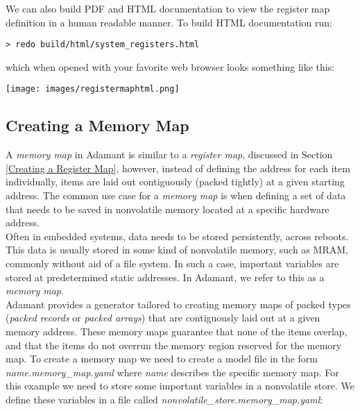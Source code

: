 We can also build PDF and HTML documentation to view the register map definition in a human readable manner. To build HTML documentation run:

\vspace{5mm} %
\begin{verbatim}
> redo build/html/system_registers.html
\end{verbatim}
\vspace{5mm} %

which when opened with your favorite web browser looks something like this:

\vspace{5mm} %
\texttt{[image: images/registermaphtml.png]}
\vspace{5mm} %

\subsection{Creating a Memory Map} \label{Creating a Memory Map}

A \textit{memory map} in Adamant is similar to a \textit{register map}, discussed in Section \ref{Creating a Register Map}, however, instead of defining the address for each item individually, items are laid out contiguously (packed tightly) at a given starting address. The common use case for a \textit{memory map} is when defining a set of data that needs to be saved in nonvolatile memory located at a specific hardware address. \\

Often in embedded systems, data needs to be stored persistently, across reboots. This data is usually stored in some kind of nonvolatile memory, such as MRAM, commonly without aid of a file system. In such a case, important variables are stored at predetermined static addresses. In Adamant, we refer to this as a \textit{memory map}. \\

Adamant provides a generator tailored to creating memory maps of packed types (\textit{packed records} or \textit{packed arrays}) that are contiguously laid out at a given memory address. These memory maps guarantee that none of the items overlap, and that the items do not overrun the memory region reserved for the memory map. To create a memory map we need to create a model file in the form \textit{name.memory\_map.yaml} where \textit{name} describes the specific memory map. For this example we need to store some important variables in a nonvolatile store. We define these variables in a file called \textit{nonvolatile\_store.memory\_map.yaml}: \\

